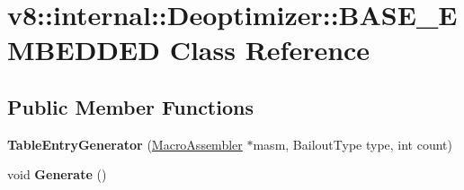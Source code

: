 \hypertarget{classv8_1_1internal_1_1_deoptimizer_1_1_b_a_s_e___e_m_b_e_d_d_e_d}{}\section{v8\+:\+:internal\+:\+:Deoptimizer\+:\+:B\+A\+S\+E\+\_\+\+E\+M\+B\+E\+D\+D\+ED Class Reference}
\label{classv8_1_1internal_1_1_deoptimizer_1_1_b_a_s_e___e_m_b_e_d_d_e_d}
\subsection*{Public Member Functions}
\begin{DoxyCompactItemize}
\item 
{\bfseries Table\+Entry\+Generator} (\hyperlink{classv8_1_1internal_1_1_macro_assembler}{Macro\+Assembler} $\ast$masm, Bailout\+Type type, int count)\hypertarget{classv8_1_1internal_1_1_deoptimizer_1_1_b_a_s_e___e_m_b_e_d_d_e_d_a0b6b42c74dc0c09149e762aab42ebf46}{}\label{classv8_1_1internal_1_1_deoptimizer_1_1_b_a_s_e___e_m_b_e_d_d_e_d_a0b6b42c74dc0c09149e762aab42ebf46}

\item 
void {\bfseries Generate} ()\hypertarget{classv8_1_1internal_1_1_deoptimizer_1_1_b_a_s_e___e_m_b_e_d_d_e_d_a1dcd8665286dd61a5cb6e02fe6e8b68f}{}\label{classv8_1_1internal_1_1_deoptimizer_1_1_b_a_s_e___e_m_b_e_d_d_e_d_a1dcd8665286dd61a5cb6e02fe6e8b68f}

\end{DoxyCompactItemize}
